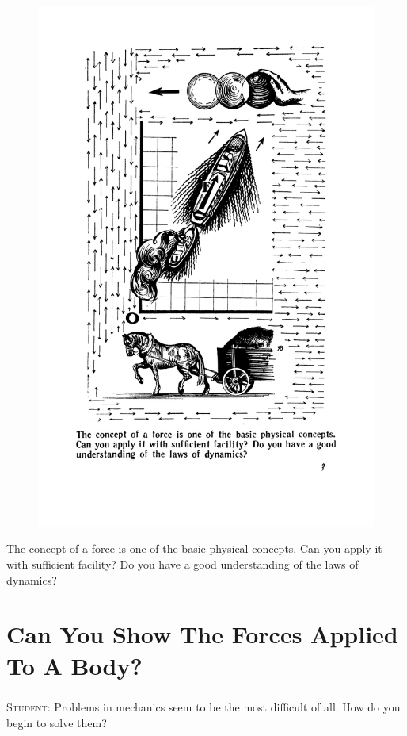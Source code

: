 \documentclass[a4paper,sfsidenotes]{tufte-book}
\begin{document}
\cleardoublepage
\thispagestyle{empty}
\vspace*{2cm}

\begin{figure}
\centering
\includegraphics[width=0.7\linewidth]{sec-a.pdf}
\end{figure}
\begin{centering}
\begin{fullwidth}
{\Large The concept of a force is one of the basic physical concepts. Can you apply it with sufficient facility? Do you have a good understanding of the laws of dynamics?}
\end{fullwidth}
\end{centering}

\chapter{Can You Show The Forces Applied To A Body?}
\label{ch-02}
\paragraph{}
\textsc{Student:} Problems in mechanics seem to be the most difficult of all. How do you begin to solve them?\\
\end{document}
